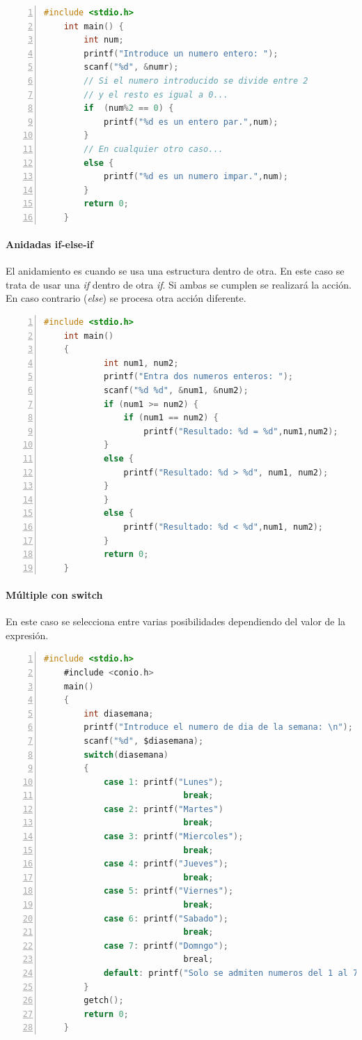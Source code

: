 \documentclass[a4paper, 11pt, titlepage]{article}
\begin{document}
            \begin{lstlisting}[language=C,numbers=left]
    #include <stdio.h>
    int main() {
        int num;
        printf("Introduce un numero entero: ");
        scanf("%d", &numr);
        // Si el numero introducido se divide entre 2 
        // y el resto es igual a 0...
        if  (num%2 == 0) {
            printf("%d es un entero par.",num);
        }
        // En cualquier otro caso...
        else {
            printf("%d es un numero impar.",num);
        }
        return 0;
    }\end{lstlisting} 

            \paragraph{Anidadas if-else-if} El anidamiento es cuando se usa una estructura 
            dentro de otra. En este caso se trata de usar una \textit{if} dentro de otra \textit{if}. Si 
            ambas se cumplen se realizará la acción. En caso contrario (\textit{else}) se procesa 
            otra acción diferente.

            \begin{lstlisting}[language=C,numbers=left]
    #include <stdio.h>
    int main() 
    {
            int num1, num2;
            printf("Entra dos numeros enteros: ");
            scanf("%d %d", &num1, &num2);
            if (num1 >= num2) {
                if (num1 == num2) {
                    printf("Resultado: %d = %d",num1,num2);
            }
            else {
                printf("Resultado: %d > %d", num1, num2);
            }
            }
            else {
                printf("Resultado: %d < %d",num1, num2);
            }
            return 0;
    }\end{lstlisting} 

            \paragraph{Múltiple con switch} En este caso se selecciona entre varias posibilidades 
            dependiendo del valor de la expresión.

            \begin{lstlisting}[language=C,numbers=left]
    #include <stdio.h>
    #include <conio.h>
    main()
    {
        int diasemana;
        printf("Introduce el numero de dia de la semana: \n");
        scanf("%d", $diasemana);
        switch(diasemana)
        {
            case 1: printf("Lunes");
                            break;
            case 2: printf("Martes")
                            break;
            case 3: printf("Miercoles");
                            break;
            case 4: printf("Jueves");
                            break;
            case 5: printf("Viernes");
                            break;
            case 6: printf("Sabado");
                            break;
            case 7: printf("Domngo");
                            breal;
            default: printf("Solo se admiten numeros del 1 al 7");
        }
        getch();
        return 0;
    }\end{lstlisting} 
\end{document}
